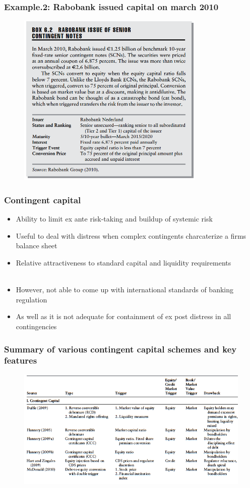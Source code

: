 \documentclass[11pt]{beamer}
\begin{document}
\begin{frame}
\frametitle{Example.2: Rabobank issued capital on march 2010}
\begin{figure}
\includegraphics[width=0.8\textwidth]{6_4.png}
\end{figure}
\end{frame}

\begin{frame}
\frametitle{Contingent capital}
\begin{itemize}
\item Ability to limit ex ante risk-taking and buildup of systemic risk
\item Useful to deal with distress when complex contingents charcaterize a firms balance sheet
\item Relative attractiveness to standard capital and liquidity requirements\\
~\\
\item However, not able to come up with international standards of banking regulation
\item As well as it is not adequate for containment of ex post distress in all contingencies
\end{itemize}
\end{frame}

\begin{frame}
\frametitle{Summary of various contingent capital schemes and key features}
\begin{figure}
\includegraphics[width=\textwidth]{6_5.png}
\end{figure}
\end{frame}
\end{document}
